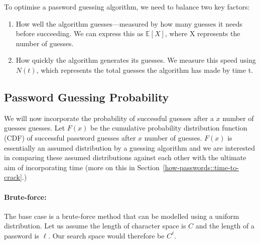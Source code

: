 To optimise a password guessing algorithm, we need to balance two key factors:
\vspace*{-0.5cm}
\begin{enumerate}
    \item How well the algorithm guesses---measured by how many guesses it needs before succeeding. We can express this as $\mathbb{E}[X]$, where X represents the number of guesses.
    \vspace{-0.25cm}
    \item How quickly the algorithm generates its guesses. We measure this speed using $N(t)$, which represents the total guesses the algorithm has made by time t.
\end{enumerate}

\subsection{Password Guessing Probability}

We will now incorporate the probability of successful guesses after a $x$ number of guesses guesses. Let $F(x)$ be the cumulative probability distribution function (CDF) of successful password guesses after $x$ number of guesses. $F(x)$ is essentially an assumed distribution by a guessing algorithm and we are interested in comparing these assumed distributions against each other with the ultimate aim of incorporating time (more on this in Section~\ref{how-passwords::time-to-crack}.)

\paragraph{Brute-force:}

The base case is a brute-force method that can be modelled using a uniform distribution. Let us assume the length of character space is $C$ and the length of a password is $\ell$. Our search space would therefore be $C^\ell$.

